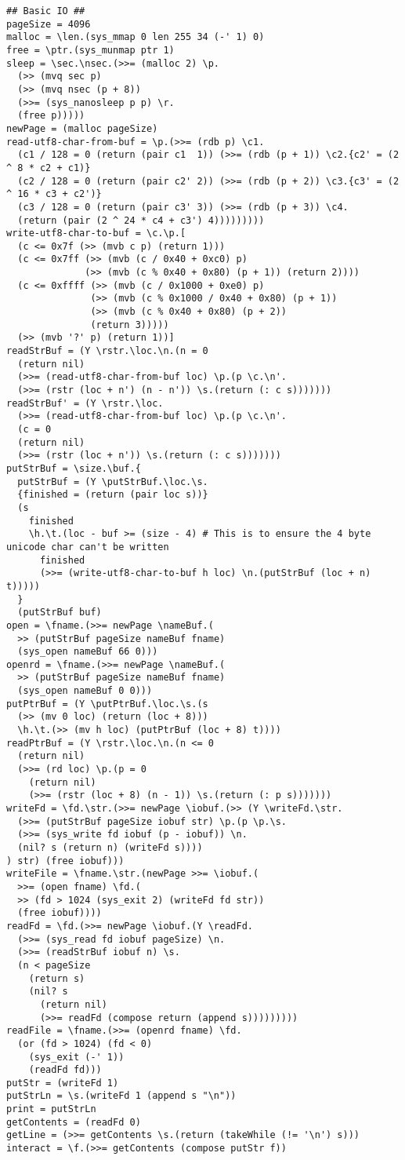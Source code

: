\begin{verbatim}
## Basic IO ##
pageSize = 4096
malloc = \len.(sys_mmap 0 len 255 34 (-' 1) 0)
free = \ptr.(sys_munmap ptr 1)
sleep = \sec.\nsec.(>>= (malloc 2) \p.
  (>> (mvq sec p) 
  (>> (mvq nsec (p + 8)) 
  (>>= (sys_nanosleep p p) \r.
  (free p)))))
newPage = (malloc pageSize)
read-utf8-char-from-buf = \p.(>>= (rdb p) \c1.
  (c1 / 128 = 0 (return (pair c1  1)) (>>= (rdb (p + 1)) \c2.{c2' = (2 ^ 8 * c2 + c1)}
  (c2 / 128 = 0 (return (pair c2' 2)) (>>= (rdb (p + 2)) \c3.{c3' = (2 ^ 16 * c3 + c2')}  
  (c3 / 128 = 0 (return (pair c3' 3)) (>>= (rdb (p + 3)) \c4.
  (return (pair (2 ^ 24 * c4 + c3') 4)))))))))
write-utf8-char-to-buf = \c.\p.[
  (c <= 0x7f (>> (mvb c p) (return 1)))
  (c <= 0x7ff (>> (mvb (c / 0x40 + 0xc0) p) 
              (>> (mvb (c % 0x40 + 0x80) (p + 1)) (return 2))))
  (c <= 0xffff (>> (mvb (c / 0x1000 + 0xe0) p)
               (>> (mvb (c % 0x1000 / 0x40 + 0x80) (p + 1))
               (>> (mvb (c % 0x40 + 0x80) (p + 2))
               (return 3)))))
  (>> (mvb '?' p) (return 1))]
readStrBuf = (Y \rstr.\loc.\n.(n = 0
  (return nil)
  (>>= (read-utf8-char-from-buf loc) \p.(p \c.\n'.
  (>>= (rstr (loc + n') (n - n')) \s.(return (: c s)))))))
readStrBuf' = (Y \rstr.\loc.
  (>>= (read-utf8-char-from-buf loc) \p.(p \c.\n'.
  (c = 0
  (return nil)
  (>>= (rstr (loc + n')) \s.(return (: c s)))))))
putStrBuf = \size.\buf.{
  putStrBuf = (Y \putStrBuf.\loc.\s.
  {finished = (return (pair loc s))}
  (s 
    finished 
    \h.\t.(loc - buf >= (size - 4) # This is to ensure the 4 byte unicode char can't be written
      finished 
      (>>= (write-utf8-char-to-buf h loc) \n.(putStrBuf (loc + n) t)))))
  }
  (putStrBuf buf)
open = \fname.(>>= newPage \nameBuf.(
  >> (putStrBuf pageSize nameBuf fname)
  (sys_open nameBuf 66 0)))
openrd = \fname.(>>= newPage \nameBuf.(
  >> (putStrBuf pageSize nameBuf fname)
  (sys_open nameBuf 0 0)))
putPtrBuf = (Y \putPtrBuf.\loc.\s.(s 
  (>> (mv 0 loc) (return (loc + 8)))
  \h.\t.(>> (mv h loc) (putPtrBuf (loc + 8) t))))
readPtrBuf = (Y \rstr.\loc.\n.(n <= 0
  (return nil)
  (>>= (rd loc) \p.(p = 0
    (return nil)
    (>>= (rstr (loc + 8) (n - 1)) \s.(return (: p s)))))))
writeFd = \fd.\str.(>>= newPage \iobuf.(>> (Y \writeFd.\str.
  (>>= (putStrBuf pageSize iobuf str) \p.(p \p.\s.
  (>>= (sys_write fd iobuf (p - iobuf)) \n.
  (nil? s (return n) (writeFd s))))
) str) (free iobuf)))
writeFile = \fname.\str.(newPage >>= \iobuf.(
  >>= (open fname) \fd.(
  >> (fd > 1024 (sys_exit 2) (writeFd fd str))
  (free iobuf))))
readFd = \fd.(>>= newPage \iobuf.(Y \readFd.
  (>>= (sys_read fd iobuf pageSize) \n.
  (>>= (readStrBuf iobuf n) \s.
  (n < pageSize
    (return s)
    (nil? s
      (return nil)
      (>>= readFd (compose return (append s)))))))))
readFile = \fname.(>>= (openrd fname) \fd.
  (or (fd > 1024) (fd < 0)
    (sys_exit (-' 1))
    (readFd fd)))
putStr = (writeFd 1)
putStrLn = \s.(writeFd 1 (append s "\n"))
print = putStrLn
getContents = (readFd 0)
getLine = (>>= getContents \s.(return (takeWhile (!= '\n') s)))
interact = \f.(>>= getContents (compose putStr f))


\end{verbatim}
